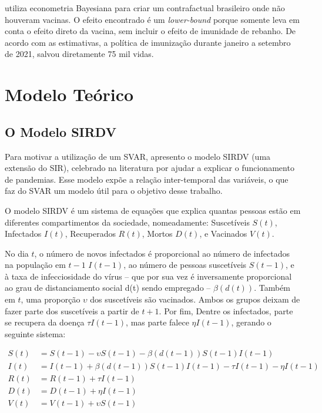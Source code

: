 \documentclass[
	12pt,				%
	oneside,			%
	a4paper,			%
	english,			%
	brazil				%
	hyperref = {colorlinks, citecolor=c1d, linkcolor=c2d, urlcolor=c3d, colorlinks}
	]{abntex2}
\newcounter{j}
\begin{document}
\textcite{Ferreira2021} utiliza econometria Bayesiana para criar um contrafactual brasileiro onde não houveram vacinas. O efeito encontrado é um \textit{lower-bound} porque somente leva em conta o efeito direto da vacina, sem incluir o efeito de imunidade de rebanho. De acordo com as estimativas, a política de imunização durante janeiro a setembro de 2021, salvou diretamente 75 mil vidas.

\let\clearpage\relax
\chapter{Modelo Teórico}\label{sec:teorico}

\section{O Modelo SIRDV}

Para motivar a utilização de um SVAR, apresento o modelo SIRDV (uma extensão do SIR), celebrado na literatura por ajudar a explicar o funcionamento de pandemias. Esse modelo expõe a relação inter-temporal das variáveis, o que faz do SVAR um modelo útil para o objetivo desse trabalho.

O modelo SIRDV é um sistema de equações que explica quantas pessoas estão em diferentes compartimentos da sociedade, nomeadamente: Suscetíveis $S(t)$, Infectados $I(t)$, Recuperados $R(t)$, Mortos $D(t)$, e Vacinados $V(t)$.

No dia $t$, o número de novos infectados é proporcional ao número de infectados na população em $t-1$ $I(t-1)$, ao número de pessoas suscetíveis $S(t-1)$, e à taxa de infecciosidade do vírus -- que por sua vez é inversamente proporcional ao grau de distanciamento social d(t) sendo empregado -- $\beta(d(t))$. Também em $t$, uma proporção $\upsilon$ dos suscetíveis são vacinados. Ambos os grupos deixam de fazer parte dos suscetíveis a partir de $t+1$. Por fim, Dentre os infectados, parte se recupera da doença $\tau I(t-1)$, mas parte falece $\eta I(t-1)$, gerando o seguinte sistema:

\begin{align*}
    S(t) &= S(t-1) - \upsilon S(t-1) - \beta(d(t-1))S(t-1)I(t-1)\\
    I(t) &= I(t-1) + \beta(d(t-1))S(t-1)I(t-1) - \tau I(t-1) - \eta I(t-1)\\
    R(t) &= R(t-1) + \tau I(t-1)\\
    D(t) &= D(t-1) + \eta I(t-1)\\
    V(t) &= V(t-1) + \upsilon S(t-1)
\end{align*}
\end{document}
